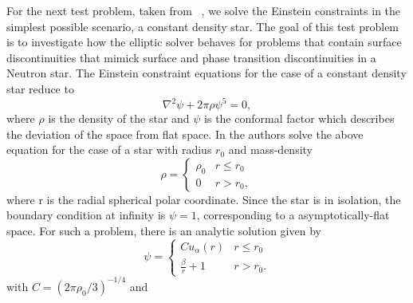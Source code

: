 For the next test problem, taken from ~\cite{baumgarte2007},  we solve the Einstein constraints in the simplest possible scenario, a constant density star. The goal of this test problem is to investigate how the elliptic solver behaves for problems that contain surface discontinuities that mimick surface and phase transition discontinuities in a Neutron star. The Einstein constraint equations for the case of a constant density star reduce to
%
%
\begin{equation}
\label{eq:Constant_Density_Star_PDE}
 \nabla^{2}\psi + 2\pi \rho \psi^{5} = 0,
\end{equation}
%
where $\rho$ is the density of the star and $\psi$ is the conformal factor which describes the deviation of the space from flat space. In \cite{baumgarte2007} the authors solve the above equation for the case of a star with radius $r_0$ and mass-density
%
\begin{equation}
\rho = \begin{cases} 
      \rho_{0} & r\leq r_0 \\
      0 & r > r_0,
   \end{cases}
\end{equation}
%
where r is the radial spherical polar coordinate. Since the star is in isolation, the boundary condition at infinity is $\psi = 1$, corresponding to a asymptotically-flat space. For such a problem, there is an analytic solution given by
%
\begin{equation}
\psi = \begin{cases} 
      Cu_{\alpha}(r) & r\leq r_0 \\
     \frac{\beta}{r} + 1 & r > r_0.
   \end{cases}
\end{equation}
%
with $C=(2\pi\rho_{0}/3)^{-1/4}$ and

